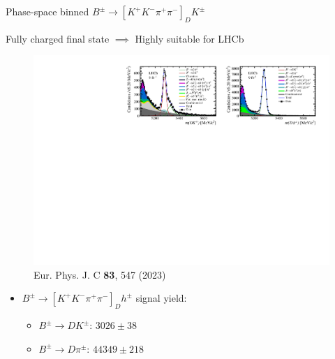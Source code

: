 \documentclass[dvipsnames]{beamer}
\begin{document}
\begin{frame}{Phase-space binned $B^\pm\to[K^+K^-\pi^+\pi^-]_DK^\pm$}
  \begin{center}
    {\large Fully charged final state $\implies$ Highly suitable for LHCb}
  \end{center}
  \begin{figure}
    \centering
    \includegraphics[width = 1.0\textwidth,trim={0 0 0 0},clip=true]{Plots/d2kkpipi_fiveL_allDP.pdf}
    \caption*{\tiny Eur. Phys. J. C \textbf{83}, 547 (2023)}
  \end{figure}
  \vspace{-0.5cm}
  \begin{itemize}
    \item{$B^\pm\to[K^+K^-\pi^+\pi^-]_Dh^\pm$ signal yield:}
    \begin{itemize}
      \item{$B^\pm\to DK^\pm$: $3026 \pm 38$}
      \item{$B^\pm\to D\pi^\pm$: $44349 \pm 218$}
    \end{itemize}
  \end{itemize}
\end{frame}
\end{document}
